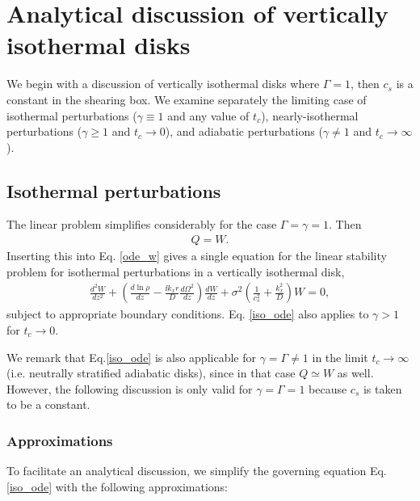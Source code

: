 \section{Analytical discussion of vertically isothermal disks} 
We begin with a discussion of vertically isothermal disks
where $\Gamma=1$, then $c_s$ is a constant in the shearing box. We
examine separately the limiting case of isothermal perturbations
($\gamma\equiv1$ and any value of $t_c$), nearly-isothermal
perturbations ($\gamma\geq 1$ and $t_c\to0$), and 
adiabatic perturbations ($\gamma\neq 1$ and $t_c\to\infty$).   
\subsection{Isothermal perturbations}\label{iso_discuss}
The linear problem simplifies considerably for the case
$\Gamma=\gamma=1$.  Then 
\begin{align}
  Q=W. 
\end{align}
Inserting this into Eq. \ref{ode_w} gives a single equation for the linear stability
problem for isothermal perturbations in a vertically isothermal disk, 
\begin{align}\label{iso_ode}
  \frac{d^2W}{dz^2} + \left(\frac{d\ln{\rho}}{dz} - \frac{\ii k_x
      r}{D}\frac{d\Omega^2}{dz}\right) \frac{dW}{dz} +
  \sigma^2\left(\frac{1}{c_s^2} + \frac{k_x^2}{D}\right)W=0, 
\end{align} 
subject to appropriate boundary conditions. Eq. \ref{iso_ode} also
applies to $\gamma>1$ for $t_c\to0$. 

We remark that Eq.\ref{iso_ode} is also applicable for    
$\gamma=\Gamma\neq 1$ in the limit $t_c\to\infty$ (i.e. neutrally
stratified adiabatic disks), since in that case  
$Q\simeq W$ as well. However, the following discussion is only
valid for $\gamma=\Gamma=1$ because $c_s$ is taken to be a constant.   

\subsubsection{Approximations}
To facilitate an analytical discussion, we simplify the governing
equation Eq. \ref{iso_ode} with the following approximations:

